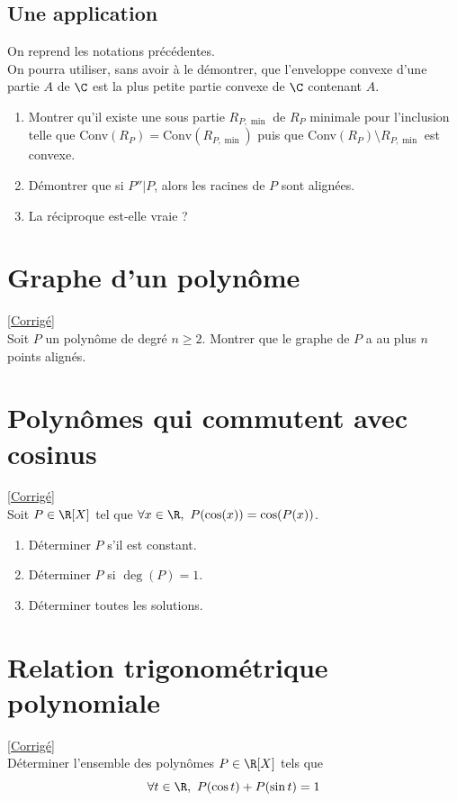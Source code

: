 \documentclass{book}
\begin{document}
	\subsection{Une application }
	On reprend les notations précédentes.\\
	On pourra utiliser, sans avoir à le démontrer, que l'enveloppe convexe d'une partie $A$ de $\C$ est la plus petite partie convexe de $\C$ contenant $A$.
	\begin{enumerate}
		\item Montrer qu'il existe une sous partie $R_{P,\min}$ de $R_P$ minimale pour l'inclusion telle que Conv$(R_P)=\text{Conv}(R_{P,\min})$ puis que Conv$(R_{P})\setminus R_{P,\min}$ est convexe.\\
		\item Démontrer que si $P''|P$, alors les racines de $P$ sont alignées.
		\item La réciproque est-elle vraie ?
	\end{enumerate}
	
	\section{Graphe d'un polynôme }
	\textcolor{blue}{\hyperref[sec:graphe-d'un-polynôme]{[Corrigé]}}\\
	\label{Graphe d'un polynôme}
	Soit $P$ un polynôme de degré $n\geq 2$. Montrer que le graphe de $P$ a au plus $n$ points alignés.
	
	\section{Polynômes qui commutent avec cosinus }
	\textcolor{blue}{\hyperref[sec:polynomes-qui-commutent-avec-cosinus-etoile3]{[Corrigé]}}\\
	\label{Polynômes qui commutent avec cosinus}
	Soit $P\in \R[X]$ tel que $\forall x\in \R,\ P(\cos(x))=\cos(P(x))$.
	\begin{enumerate}
		\item Déterminer $P$ s'il est constant.
		\item Déterminer $P$ si $\deg(P)=1$.
		\item Déterminer toutes les solutions.
	\end{enumerate}
	
	\section{Relation trigonométrique polynomiale }
	\textcolor{blue}{\hyperref[sec:relation-trigonometrique-polynomiale-etoile3]{[Corrigé]}}\\
	\label{relationtrigopoly}
	\label{Relation trigonométrique polynomiale}
	Déterminer l'ensemble des polynômes $P\in \R[X]$ tels que
	$$\forall t\in \R,\ P(\cos t)+P(\sin t)=1$$
	
\end{document}
